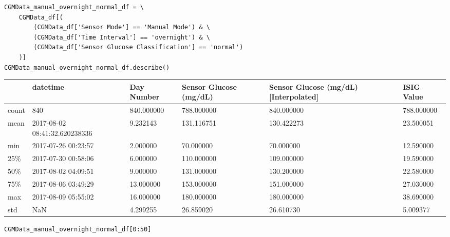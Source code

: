 \begin{verbatim}
CGMData_manual_overnight_normal_df = \
    CGMData_df[(
        (CGMData_df['Sensor Mode'] == 'Manual Mode') & \
        (CGMData_df['Time Interval'] == 'overnight') & \
        (CGMData_df['Sensor Glucose Classification'] == 'normal')
    )]
CGMData_manual_overnight_normal_df.describe()
\end{verbatim}

\bigskip\noindent
\begin{tabular}{p{}p{}p{}p{}p{}p{}}
\toprule
 & datetime & Day Number & Sensor Glucose (mg/dL) & Sensor Glucose (mg/dL) [Interpolated] & ISIG Value \\
\hline
count & 840 & 840.000000 & 788.000000 & 840.000000 & 788.000000 \\
\hline
mean & 2017-08-02 08:41:32.620238336 & 9.232143 & 131.116751 & 130.422273 & 23.500051 \\
\hline
min & 2017-07-26 00:23:57 & 2.000000 & 70.000000 & 70.000000 & 12.590000 \\
\hline
25\% & 2017-07-30 00:58:06 & 6.000000 & 110.000000 & 109.000000 & 19.590000 \\
\hline
50\% & 2017-08-02 04:09:51 & 9.000000 & 131.000000 & 130.200000 & 22.580000 \\
\hline
75\% & 2017-08-06 03:49:29 & 13.000000 & 153.000000 & 151.000000 & 27.030000 \\
\hline
max & 2017-08-09 05:55:02 & 16.000000 & 180.000000 & 180.000000 & 38.690000 \\
\hline
std & NaN & 4.299255 & 26.859020 & 26.610730 & 5.009377 \\
\hline
\bottomrule
\end{tabular}

\bigskip

\begin{verbatim}
CGMData_manual_overnight_normal_df[0:50]
\end{verbatim}

